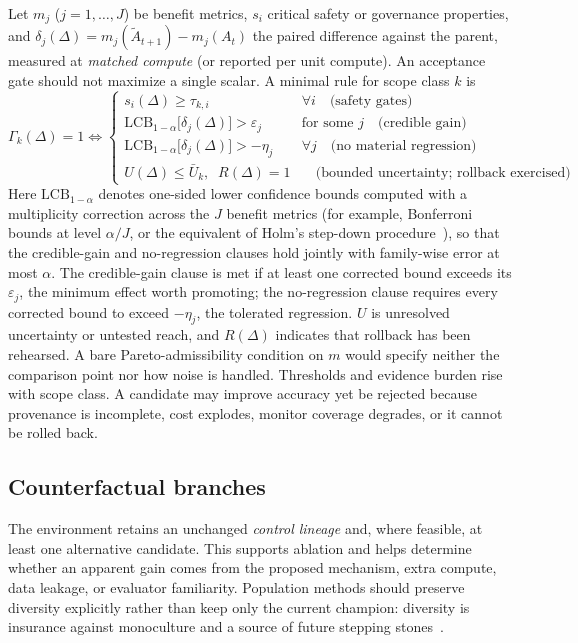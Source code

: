 \documentclass[11pt,a4paper]{article}
\newcommand{\LCB}{\mathrm{LCB}}
\begin{document}
Let $m_j$ ($j = 1,\dots,J$) be benefit metrics, $s_i$ critical safety or governance properties, and $\delta_j(\Delta) = m_j(\tilde{A}_{t+1}) - m_j(A_t)$ the paired difference against the parent, measured at \emph{matched compute} (or reported per unit compute). An acceptance gate should not maximize a single scalar. A minimal rule for scope class $k$ is
\begin{equation}\label{eq:gate}
\Gamma_k(\Delta) = 1 \iff
\begin{cases}
s_i(\Delta) \geq \tau_{k,i} & \forall i \quad \text{(safety gates)}\\[2pt]
\LCB_{1-\alpha}\bigl[\delta_j(\Delta)\bigr] > \varepsilon_j & \text{for some } j \quad \text{(credible gain)}\\[2pt]
\LCB_{1-\alpha}\bigl[\delta_j(\Delta)\bigr] > -\eta_j & \forall j \quad \text{(no material regression)}\\[2pt]
U(\Delta) \leq \bar{U}_k, \;\; R(\Delta) = 1 & \quad \text{(bounded uncertainty; rollback exercised)}
\end{cases}
\end{equation}
Here $\LCB_{1-\alpha}$ denotes one-sided lower confidence bounds computed with a multiplicity correction across the $J$ benefit metrics (for example, Bonferroni bounds at level $\alpha/J$, or the equivalent of Holm's step-down procedure~\cite{holm}), so that the credible-gain and no-regression clauses hold jointly with family-wise error at most $\alpha$. The credible-gain clause is met if at least one corrected bound exceeds its $\varepsilon_j$, the minimum effect worth promoting; the no-regression clause requires every corrected bound to exceed $-\eta_j$, the tolerated regression. $U$ is unresolved uncertainty or untested reach, and $R(\Delta)$ indicates that rollback has been rehearsed. A bare Pareto-admissibility condition on $m$ would specify neither the comparison point nor how noise is handled. Thresholds and evidence burden rise with scope class. A candidate may improve accuracy yet be rejected because provenance is incomplete, cost explodes, monitor coverage degrades, or it cannot be rolled back.

\subsection{Counterfactual branches}

The environment retains an unchanged \emph{control lineage} and, where feasible, at least one alternative candidate. This supports ablation and helps determine whether an apparent gain comes from the proposed mechanism, extra compute, data leakage, or evaluator familiarity. Population methods should preserve diversity explicitly rather than keep only the current champion: diversity is insurance against monoculture and a source of future stepping stones~\cite{novelty}.
\end{document}
